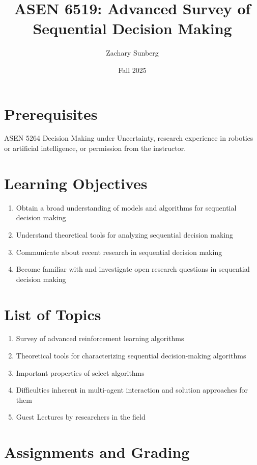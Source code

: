 \documentclass[9pt]{article}
\title{ASEN 6519: Advanced Survey of Sequential Decision Making}
\author{Zachary Sunberg}
\date{Fall 2025}
\begin{document}
\maketitle

\section*{Prerequisites}

ASEN 5264 Decision Making under Uncertainty, research experience in robotics or artificial intelligence, or permission from the instructor.

\section*{Learning Objectives}

\begin{enumerate}[nosep]
    \item Obtain a broad understanding of models and algorithms for sequential decision making
    \item Understand theoretical tools for analyzing sequential decision making
    \item Communicate about recent research in sequential decision making
    \item Become familiar with and investigate open research questions in sequential decision making
\end{enumerate}

\section*{List of Topics}

\begin{enumerate}[nosep]
    \item Survey of advanced reinforcement learning algorithms
    \item Theoretical tools for characterizing sequential decision-making algorithms
    \item Important properties of select algorithms
    \item Difficulties inherent in multi-agent interaction and solution approaches for them
    \item Guest Lectures by researchers in the field
\end{enumerate}

\section*{Assignments and Grading}
\end{document}
